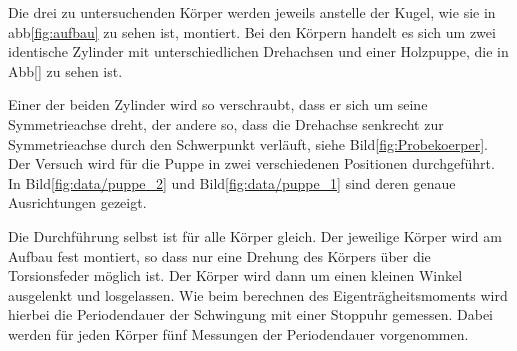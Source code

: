 Die drei zu untersuchenden Körper werden jeweils anstelle der Kugel, wie sie in abb\ref{fig:aufbau} zu sehen ist, montiert.
Bei den Körpern handelt es sich um zwei identische Zylinder mit unterschiedlichen Drehachsen und einer Holzpuppe, die in Abb[]
zu sehen ist. 

Einer der beiden Zylinder wird so verschraubt, dass er sich um seine Symmetrieachse dreht, der andere so, dass die Drehachse senkrecht
zur Symmetrieachse durch den Schwerpunkt verläuft, siehe Bild\ref{fig:Probekoerper}. Der Versuch wird für die Puppe in zwei 
verschiedenen Positionen durchgeführt. In Bild\ref{fig:data/puppe_2} und Bild\ref{fig:data/puppe_1} sind deren genaue Ausrichtungen gezeigt. 

Die Durchführung selbst ist für alle Körper gleich. Der jeweilige Körper wird am Aufbau fest montiert, so dass nur eine Drehung des 
Körpers über die Torsionsfeder möglich ist. Der Körper wird dann um einen kleinen Winkel ausgelenkt und losgelassen. Wie beim berechnen
des Eigenträgheitsmoments wird hierbei die Periodendauer der Schwingung mit einer Stoppuhr gemessen. Dabei werden für jeden Körper 
fünf Messungen der Periodendauer vorgenommen. 


